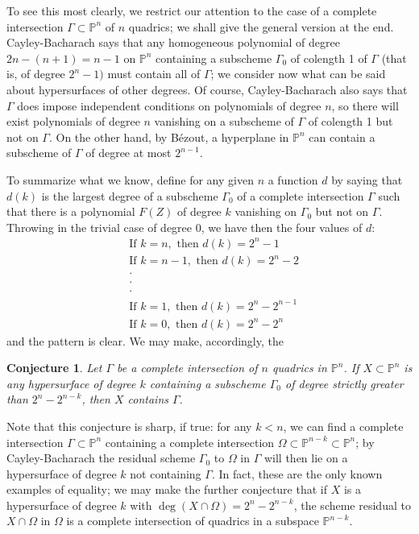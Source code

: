\documentclass{bull-l}
\theoremstyle{pplain}
\newtheorem{concb}[thmcb]{Conjecture}
\theoremstyle{definition}
\begin{document}
To see this most clearly, we restrict our attention to the case of a complete
intersection $\Gamma\subset \mathbb{P}^n$ of $n$ quadrics; we shall give the
general version at the end.  Cayley-Bacharach says that any homogeneous 
polynomial of degree $2n-(n+1)=n-1$ on $\mathbb{P}^n$ containing a subscheme $
\Gamma_0$ of colength 1 of $\Gamma$ (that is, of degree $2^n-1)$ must contain
all of $\Gamma$; we consider now what can be said about hypersurfaces of other
degrees.  Of course, Cayley-Bacharach also says that $\Gamma$ does impose
independent conditions on polynomials of degree $n$, so there will exist 
polynomials of degree $n$ vanishing on a subscheme of $\Gamma$ of colength 1 but
not on $\Gamma$.  On the other hand, by B\'ezout, a hyperplane in $\mathbb{P}^n$
can contain a subscheme of $\Gamma$ of degree at most $2^{n-1}$.

To summarize what we know, define for any given $n$ a function $d$ by saying
that $d(k)$ is the largest degree of a subscheme $\Gamma_0$ of a complete
intersection $\Gamma$ such that there is a polynomial $F(Z)$ of degree $k$
vanishing on $\Gamma_0$ but not on $\Gamma$.  Throwing in the trivial case of
degree 0, we have then the four values of $d$:
\begin{align*}
&\text{If }k=n, \text{ then }d(k)=2^n-1\\
&\text{If }k=n-1, \text{ then }d(k)=2^n-2\\
&\cdot\\
&\cdot\\
&\cdot\\
&\text{If }k=1, \text{ then }d(k)=2^n-2^{n-1}\\
&\text{If }k=0, \text{ then }d(k)=2^n-2^n
\end{align*}
and the pattern is clear.  We may make, accordingly, the 

\begin{concb} \label{concb10}
Let $\Gamma$ be a complete intersection of $n$ quadrics in $\mathbb{P}^n$.  If
$X\subset \mathbb{P}^n$ is any hypersurface of degree $k$ containing a
subscheme $\Gamma_0$ of degree strictly greater than $2^n-2^{n-k}$, then $X$
contains $\Gamma$.
\end{concb}

Note that this conjecture is sharp, if true: for any $k<n$, we can find a
complete intersection $\Gamma\subset \mathbb{P}^n$ containing a complete
intersection $\Omega\subset\mathbb{P}^{n-k}\subset \mathbb{P}^n$; by 
Cayley-Bacharach the residual scheme $\Gamma_0$ to $\Omega$ in $\Gamma$ will
then lie on a hypersurface of degree $k$ not containing $\Gamma$. In fact,
these are the only known examples of equality; we may make the further 
conjecture that if $X$ is a hypersurface of degree $k$ with $\deg(X\cap
\Omega)=2^n-2^{n-k}$, the scheme residual to $X\cap \Omega$ in $\Omega$ is a
complete intersection of quadrics in a subspace $\mathbb{P}^{n-k}$.
\end{document}
